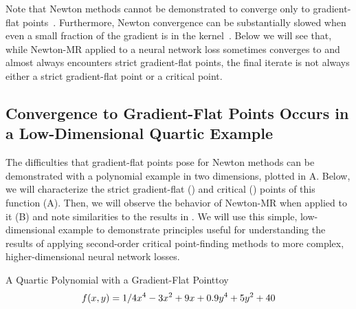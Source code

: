 \documentclass[../../thesis.tex]{subfiles}
\begin{document}
Note that Newton methods cannot be demonstrated to converge
only to gradient-flat points~\cite{powell1970,byrd2004}.
Furthermore, Newton convergence can be substantially slowed
when even a small fraction of the gradient
is in the kernel~\cite{griewank1983}.
Below we will see that,
while Newton-MR applied to a neural network loss
sometimes converges to and almost always encounters strict gradient-flat points,
the final iterate is not always either
a strict gradient-flat point or a critical point.

\subsection{Convergence to Gradient-Flat Points Occurs in a Low-Dimensional Quartic Example}%

The difficulties that gradient-flat points pose for Newton methods
can be demonstrated with a polynomial example in two dimensions,
plotted in A.
Below,
we will characterize
the strict gradient-flat (\failcolor{})
and critical (\successcolor{}) points of this function
(A).
Then, we will observe the behavior of Newton-MR
when applied to it (B)
and note similarities to the results in .
We will use this simple, low-dimensional example
to demonstrate principles useful
for understanding the results of applying
second-order critical point-finding methods to more complex,
higher-dimensional neural network losses.

\begin{example}{A Quartic Polynomial with a Gradient-Flat Point}{toy}
	\begin{equation}\equationlabel{toy}
	    f(x, y) = 1/4 x^4 - 3x^2 + 9x + 0.9y^4 + 5y^2 + 40
	\end{equation}
\end{example}
\end{document}
